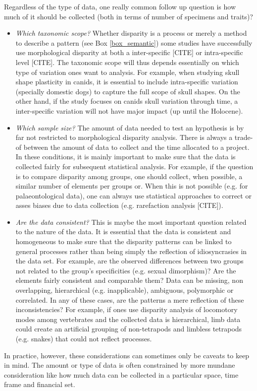 \documentclass[12pt,letterpaper]{article}
\begin{document}
Regardless of the type of data, one really common follow up question is how much of it should be collected (both in terms of number of specimens and traits)?
\begin{itemize}
    \item \textit{Which taxonomic scope?}
    Whether disparity is a process or merely a method to describe a pattern (see Box \ref{box_semantic}) some studies have successfully use morphological disparity at both a inter-specific [CITE] or intra-specific level [CITE].
    The taxonomic scope will thus depends essentially on which type of variation ones want to analysis.
    For example, when studying skull shape plasticity in canids, it is essential to include intra-specific variation (specially domestic dogs) to capture the full scope of skull shapes.
    On the other hand, if the study focuses on canids skull variation through time, a inter-specific variation will not have major impact (up until the Holocene). %
    \item \textit{Which sample size?}
    The amount of data needed to test an hypothesis is by far not restricted to morphological disparity analysis.
    There is always a trade-of between the amount of data to collect and the time allocated to a project.
    In these conditions, it is mainly important to make sure that the data is collected fairly for subsequent statistical analysis.
    For example, if the question is to compare disparity among groups, one should collect, when possible, a similar number of elements per groups or.
    When this is not possible (e.g. for palaeontological data), one can always use statistical approaches to correct or asses biases due to data collection (e.g. rarefaction analysis [CITE]).
    \item \textit{Are the data consistent?}
    This is maybe the most important question related to the nature of the data.
    It is essential that the data is consistent and homogeneous to make sure that the disparity patterns can be linked to general processes rather than being simply the reflection of idiosyncrasies in the data set.
    For example, are the observed differences between two groups not related to the group's specificities (e.g. sexual dimorphism)?
    Are the elements fairly consistent and comparable them?
    Data can be missing, non overlapping, hierarchical (e.g. inapplicable), ambiguous, polymorphic or correlated.
    In any of these cases, are the patterns a mere reflection of these inconsistencies?
    For example, if ones use disparity analysis of locomotory modes among vertebrates and the collected data is hierarchical, limb data could create an artificial grouping of non-tetrapods and limbless tetrapods (e.g. snakes) that could not reflect processes.
\end{itemize}
In practice, however, these considerations can sometimes only be caveats to keep in mind.
The amount or type of data is often constrained by more mundane consideration like how much data can be collected in a particular space, time frame and financial set. 
\end{document}
